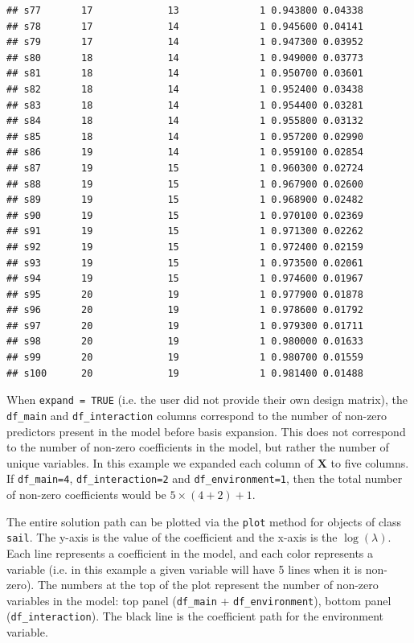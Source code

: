 \documentclass[12pt,letter]{article}\usepackage[]{graphicx}\usepackage[]{color}
\makeatletter
\newenvironment{kframe}{%
 \def\at@end@of@kframe{}%
 \ifinner\ifhmode%
  \def\at@end@of@kframe{\end{minipage}}%
  \begin{minipage}{\columnwidth}%
 \fi\fi%
 \def\FrameCommand##1{\hskip\@totalleftmargin \hskip-\fboxsep
 \colorbox{shadecolor}{##1}\hskip-\fboxsep
     \hskip-\linewidth \hskip-\@totalleftmargin \hskip\columnwidth}%
 \MakeFramed {\advance\hsize-\width
   \@totalleftmargin\z@ \linewidth\hsize
   \@setminipage}}%
 {\par\unskip\endMakeFramed%
 \at@end@of@kframe}
\newenvironment{knitrout}{}{} %
\newcommand{\sail}{\texttt{sail}}
\makeatother
\begin{document}
\begin{knitrout}
\begin{kframe}
\begin{verbatim}
## s77       17             13              1 0.943800 0.04338
## s78       17             14              1 0.945600 0.04141
## s79       17             14              1 0.947300 0.03952
## s80       18             14              1 0.949000 0.03773
## s81       18             14              1 0.950700 0.03601
## s82       18             14              1 0.952400 0.03438
## s83       18             14              1 0.954400 0.03281
## s84       18             14              1 0.955800 0.03132
## s85       18             14              1 0.957200 0.02990
## s86       19             14              1 0.959100 0.02854
## s87       19             15              1 0.960300 0.02724
## s88       19             15              1 0.967900 0.02600
## s89       19             15              1 0.968900 0.02482
## s90       19             15              1 0.970100 0.02369
## s91       19             15              1 0.971300 0.02262
## s92       19             15              1 0.972400 0.02159
## s93       19             15              1 0.973500 0.02061
## s94       19             15              1 0.974600 0.01967
## s95       20             19              1 0.977900 0.01878
## s96       20             19              1 0.978600 0.01792
## s97       20             19              1 0.979300 0.01711
## s98       20             19              1 0.980000 0.01633
## s99       20             19              1 0.980700 0.01559
## s100      20             19              1 0.981400 0.01488
\end{verbatim}
\end{kframe}
\end{knitrout}

When \texttt{expand = TRUE} (i.e. the user did not provide their own design matrix), the \texttt{df\_main} and \texttt{df\_interaction} columns correspond to the number of non-zero predictors present in the model before basis expansion. This does not correspond to the number of non-zero coefficients in the model, but rather the number of unique variables. In this example we expanded each column of $\mathbf{X}$ to five columns. If  \texttt{df\_main=4}, \texttt{df\_interaction=2} and \texttt{df\_environment=1}, then the total number of non-zero coefficients would be $5 \times (4+2) + 1$.  

The entire solution path can be plotted via the \texttt{plot} method for objects of class \sail. The y-axis is the value of the coefficient and the x-axis is the $\log(\lambda)$. Each line represents a coefficient in the model, and each color represents a variable (i.e. in this example a given variable will have 5 lines when it is non-zero). The numbers at the top of the plot represent the number of non-zero variables in the model: top panel (\texttt{df\_main} + \texttt{df\_environment}), bottom panel (\texttt{df\_interaction}). The black line is the coefficient path for the environment variable.  
\end{document}
